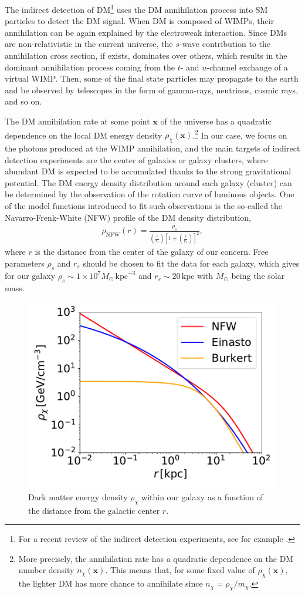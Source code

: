 \documentclass[12pt,twoside,book]{article}
\begin{document}
The indirect detection of DM\footnote{
  For a recent review of the indirect detection experiments, see for example \cite{Gaskins:2016cha}.
}
uses the DM annihilation process into SM particles to detect the DM signal.
When DM is composed of WIMPs, their annihilation can be again explained by the electroweak interaction.
Since DMs are non-relativistic in the current universe, the $s$-wave contribution to the annihilation cross section, if exists, dominates over others, which results in the dominant annihilation process coming from the $t$- and $u$-channel exchange of a virtual WIMP.
Then, some of the final state particles may propagate to the earth and be observed by telescopes in the form of gamma-rays, neutrinos, cosmic rays, and so on.

The DM annihilation rate at some point $\bm{x}$ of the universe has a quadratic dependence on the local DM energy density $\rho_\chi (\bm{x})$.\footnote{
  More precisely, the annihilation rate has a quadratic dependence on the DM number density $n_\chi (\bm{x})$.
  This means that, for some fixed value of $\rho_\chi (\bm{x})$, the lighter DM has more chance to annihilate since $n_\chi = \rho_\chi / m_\chi$.
}
In our case, we focus on the photons produced at the WIMP annihilation, and the main targets of indirect detection experiments are the center of galaxies or galaxy clusters, where abundant DM is expected to be accumulated thanks to the strong gravitational potential.
The DM energy density distribution around each galaxy (cluster) can be determined by the observation of the rotation curve of luminous objects.
One of the model functions introduced to fit such observations is the so-called the Navarro-Frenk-White (NFW) profile \cite{Navarro:1995iw, Navarro:1996gj} of the DM density distribution,
\begin{align}
  \rho_{\mathrm{NFW}} (r) = \frac{\rho_s}
  { \left( \frac{r}{r_s} \right) \left[ 1 + \left( \frac{r}{r_s} \right) \right]^2},
\end{align}
where $r$ is the distance from the center of the galaxy of our concern.
Free parameters $\rho_s$ and $r_s$ should be chosen to fit the data for each galaxy, which gives for our galaxy $\rho_s \sim 1\times 10^7 M_\odot\, \mathrm{kpc}^{-3}$ and $r_s \sim 20\,\mathrm{kpc}$ \cite{Fornasa:2013iaa} with $M_\odot$ being the solar mass.

\begin{figure}
  \centering
  \includegraphics[width=0.5\hsize]{profile.pdf}
  \caption{
    Dark matter energy density $\rho_\chi$ within our galaxy as a function of the distance from the galactic center $r$.
  }
  \label{fig:profile}
\end{figure}
\end{document}
